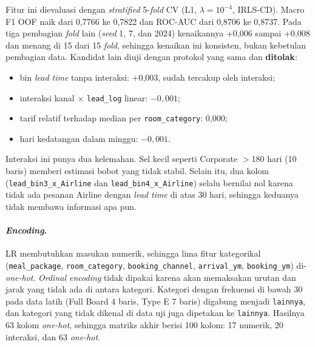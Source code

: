 Fitur ini dievaluasi dengan \textit{stratified} 5-\textit{fold} CV (L1, $\lambda = 10^{-4}$, IRLS-CD). Macro F1 OOF naik dari 0,7766 ke 0,7822 dan ROC-AUC dari 0,8706 ke 0,8737. Pada tiga pembagian \textit{fold} lain (\textit{seed} 1, 7, dan 2024) kenaikannya +0,006 sampai +0,008 dan menang di 15 dari 15 \textit{fold}, sehingga kenaikan ini konsisten, bukan kebetulan pembagian data. Kandidat lain diuji dengan protokol yang sama dan \textbf{ditolak}:
\begin{itemize}
	\item bin \textit{lead time} tanpa interaksi: +0,003, sudah tercakup oleh interaksi;
	\item interaksi kanal $\times$ \texttt{lead\_log} linear: $-0{,}001$;
	\item tarif relatif terhadap median per \texttt{room\_category}: 0,000;
	\item hari kedatangan dalam minggu: $-0{,}001$.
\end{itemize}

Interaksi ini punya dua kelemahan. Sel kecil seperti Corporate $>$180 hari (10 baris) memberi estimasi bobot yang tidak stabil. Selain itu, dua kolom (\texttt{lead\_bin3\_x\_Airline} dan \texttt{lead\_bin4\_x\_Airline}) selalu bernilai nol karena tidak ada pesanan Airline dengan \textit{lead time} di atas 30 hari, sehingga keduanya tidak membawa informasi apa pun.

\paragraph{\textit{Encoding}.} LR membutuhkan masukan numerik, sehingga lima fitur kategorikal (\texttt{meal\_package}, \texttt{room\_category}, \texttt{booking\_channel}, \texttt{arrival\_ym}, \texttt{booking\_ym}) di-\textit{one-hot}. \textit{Ordinal encoding} tidak dipakai karena akan memaksakan urutan dan jarak yang tidak ada di antara kategori. Kategori dengan frekuensi di bawah 30 pada data latih (Full Board 4 baris, Type E 7 baris) digabung menjadi \texttt{lainnya}, dan kategori yang tidak dikenal di data uji juga dipetakan ke \texttt{lainnya}. Hasilnya 63 kolom \textit{one-hot}, sehingga matriks akhir berisi 100 kolom: 17 numerik, 20 interaksi, dan 63 \textit{one-hot}.

